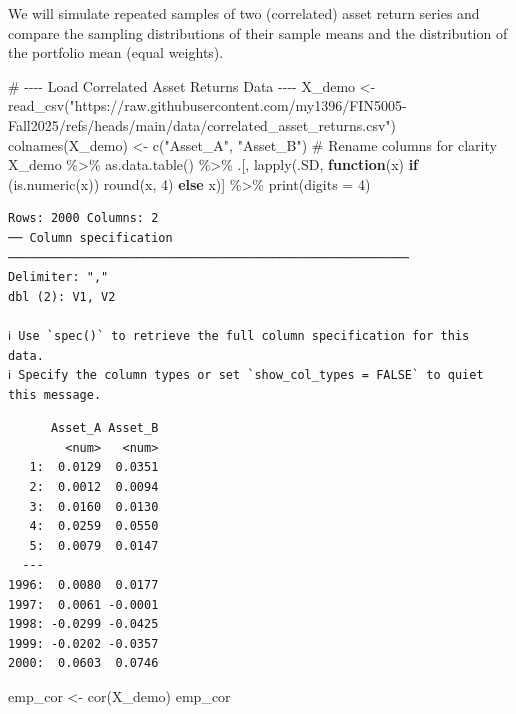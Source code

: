 \documentclass[
  12pt,
  letterpaper,
]{scrbook}
\newenvironment{Shaded}{\begin{snugshade}}{\end{snugshade}}
\newcommand{\AttributeTok}[1]{\textcolor[rgb]{0.40,0.45,0.13}{#1}}
\newcommand{\CommentTok}[1]{\textcolor[rgb]{0.37,0.37,0.37}{#1}}
\newcommand{\ControlFlowTok}[1]{\textcolor[rgb]{0.00,0.23,0.31}{\textbf{#1}}}
\newcommand{\DecValTok}[1]{\textcolor[rgb]{0.68,0.00,0.00}{#1}}
\newcommand{\FunctionTok}[1]{\textcolor[rgb]{0.28,0.35,0.67}{#1}}
\newcommand{\NormalTok}[1]{\textcolor[rgb]{0.00,0.23,0.31}{#1}}
\newcommand{\OtherTok}[1]{\textcolor[rgb]{0.00,0.23,0.31}{#1}}
\newcommand{\SpecialCharTok}[1]{\textcolor[rgb]{0.37,0.37,0.37}{#1}}
\newcommand{\StringTok}[1]{\textcolor[rgb]{0.13,0.47,0.30}{#1}}
\theoremstyle{plain}
\theoremstyle{definition}
\theoremstyle{remark}
\begin{document}
We will simulate repeated samples of two (correlated) asset return
series and compare the sampling distributions of their sample means and
the distribution of the portfolio mean (equal weights).

\begin{Shaded}
\begin{Highlighting}[]
\CommentTok{\# {-}{-}{-}{-} Load Correlated Asset Returns Data {-}{-}{-}{-}}
\NormalTok{X\_demo }\OtherTok{\textless{}{-}} \FunctionTok{read\_csv}\NormalTok{(}\StringTok{"https://raw.githubusercontent.com/my1396/FIN5005{-}Fall2025/refs/heads/main/data/correlated\_asset\_returns.csv"}\NormalTok{)}
\FunctionTok{colnames}\NormalTok{(X\_demo) }\OtherTok{\textless{}{-}} \FunctionTok{c}\NormalTok{(}\StringTok{"Asset\_A"}\NormalTok{, }\StringTok{"Asset\_B"}\NormalTok{)  }\CommentTok{\# Rename columns for clarity}
\NormalTok{X\_demo }\SpecialCharTok{\%\textgreater{}\%}
    \FunctionTok{as.data.table}\NormalTok{() }\SpecialCharTok{\%\textgreater{}\%}
\NormalTok{    .[, }\FunctionTok{lapply}\NormalTok{(.SD, }\ControlFlowTok{function}\NormalTok{(x) }\ControlFlowTok{if}\NormalTok{ (}\FunctionTok{is.numeric}\NormalTok{(x)) }\FunctionTok{round}\NormalTok{(x, }\DecValTok{4}\NormalTok{) }\ControlFlowTok{else}\NormalTok{ x)] }\SpecialCharTok{\%\textgreater{}\%}
    \FunctionTok{print}\NormalTok{(}\AttributeTok{digits =} \DecValTok{4}\NormalTok{)}
\end{Highlighting}
\end{Shaded}

\begin{verbatim}
Rows: 2000 Columns: 2
── Column specification ────────────────────────────────────────────────────────
Delimiter: ","
dbl (2): V1, V2

ℹ Use `spec()` to retrieve the full column specification for this data.
ℹ Specify the column types or set `show_col_types = FALSE` to quiet this message.
\end{verbatim}

\begin{verbatim}
      Asset_A Asset_B
        <num>   <num>
   1:  0.0129  0.0351
   2:  0.0012  0.0094
   3:  0.0160  0.0130
   4:  0.0259  0.0550
   5:  0.0079  0.0147
  ---                
1996:  0.0080  0.0177
1997:  0.0061 -0.0001
1998: -0.0299 -0.0425
1999: -0.0202 -0.0357
2000:  0.0603  0.0746
\end{verbatim}

\begin{Shaded}
\begin{Highlighting}[]
\NormalTok{emp\_cor }\OtherTok{\textless{}{-}} \FunctionTok{cor}\NormalTok{(X\_demo)}
\NormalTok{emp\_cor}
\end{Highlighting}
\end{Shaded}
\end{document}
